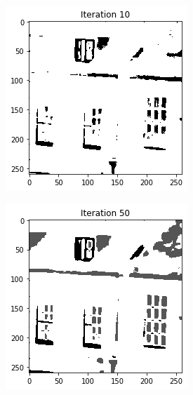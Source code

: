 \documentclass[11pt]{article}
\begin{document}
\begin{figure}[!htb]
\begin{center}
\begin{multicols}{5}
    \includegraphics[height = \linewidth]{house_10}\par
	\includegraphics[height = \linewidth]{house_50}\

\end{multicols}
\end{center}
\end{figure}
\end{document}
